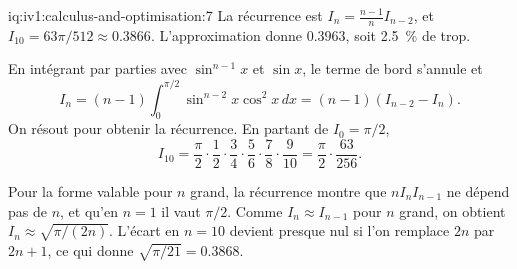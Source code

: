 \begin{solution}{iq:iv1:calculus-and-optimisation:7}
La récurrence est $I_n = \frac{n - 1}{n}I_{n - 2}$, et $I_{10} = 63\pi/512 \approx 0.3866$. L'approximation donne $0.3963$, soit 2.5~\% de trop.

En intégrant par parties avec $\sin^{n - 1}x$ et $\sin x$, le terme de bord s'annule et
\[
I_n = (n - 1)\int_0^{\pi/2}\sin^{n - 2}x\cos^2 x\,dx = (n - 1)(I_{n - 2} - I_n).
\]
On résout pour obtenir la récurrence. En partant de $I_0 = \pi/2$,
\[
I_{10} = \frac{\pi}{2}\cdot\frac12\cdot\frac34\cdot\frac56\cdot\frac78\cdot\frac{9}{10} = \frac{\pi}{2}\cdot\frac{63}{256}.
\]

Pour la forme valable pour $n$ grand, la récurrence montre que $nI_nI_{n - 1}$ ne dépend pas de $n$, et qu'en $n = 1$ il vaut $\pi/2$. Comme $I_n \approx I_{n - 1}$ pour $n$ grand, on obtient $I_n \approx \sqrt{\pi/(2n)}$. L'écart en $n = 10$ devient presque nul si l'on remplace $2n$ par $2n + 1$, ce qui donne $\sqrt{\pi/21} = 0.3868$.



\end{solution}

